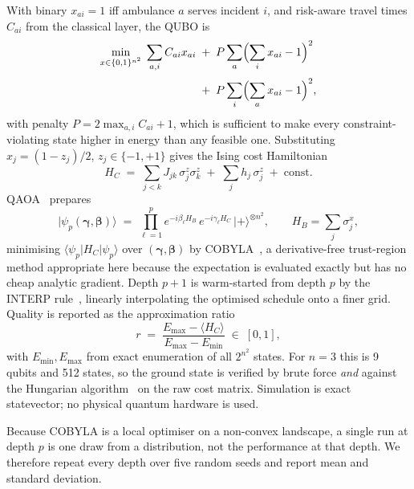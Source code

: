 \documentclass[journal]{IEEEtran}
\begin{document}
With binary $x_{ai}=1$ iff ambulance $a$ serves incident $i$, and risk-aware
travel times $C_{ai}$ from the classical layer, the QUBO is
\begin{equation}
\begin{aligned}
\min_{x\in\{0,1\}^{n^2}}\; \sum_{a,i} C_{ai}x_{ai}
\;&+\; P\sum_{a}\Bigl(\sum_i x_{ai}-1\Bigr)^{2} \\[2pt]
&+\; P\sum_{i}\Bigl(\sum_a x_{ai}-1\Bigr)^{2},
\end{aligned}
\label{eq:qubo}
\end{equation}
with penalty $P=2\max_{a,i}C_{ai}+1$, which is sufficient to make every
constraint-violating state higher in energy than any feasible one. Substituting
$x_j=(1-z_j)/2$, $z_j\in\{-1,+1\}$ gives the Ising cost
Hamiltonian~\citep{lucas2014}
\begin{equation}
H_C \;=\; \sum_{j<k} J_{jk}\,\sigma^z_j\sigma^z_k \;+\; \sum_j h_j\,\sigma^z_j
\;+\; \mathrm{const}.
\label{eq:ising}
\end{equation}
QAOA~\citep{farhi2014} prepares
\begin{equation}
\lvert\psi_p(\boldsymbol\gamma,\boldsymbol\beta)\rangle \;=\;
\prod_{\ell=1}^{p} e^{-i\beta_\ell H_B}\,e^{-i\gamma_\ell H_C}\,
\lvert +\rangle^{\otimes n^2},
\qquad H_B=\sum_j \sigma^x_j,
\label{eq:qaoa}
\end{equation}
minimising $\langle\psi_p\lvert H_C\rvert\psi_p\rangle$ over
$(\boldsymbol\gamma,\boldsymbol\beta)$ by COBYLA~\citep{powell1994}, a
derivative-free trust-region method appropriate here because the expectation is
evaluated exactly but has no cheap analytic gradient. Depth $p+1$ is warm-started
from depth $p$ by the INTERP rule~\citep{zhou2020}, linearly interpolating the
optimised schedule onto a finer grid. Quality is reported as the approximation
ratio
\begin{equation}
r \;=\; \frac{E_{\max}-\langle H_C\rangle}{E_{\max}-E_{\min}} \;\in\; [0,1],
\label{eq:ratio}
\end{equation}
with $E_{\min},E_{\max}$ from exact enumeration of all $2^{n^2}$ states. For
$n=3$ this is 9 qubits and 512 states, so the ground state is verified by brute
force \emph{and} against the Hungarian algorithm~\citep{kuhn1955} on the raw cost
matrix. Simulation is exact statevector; no physical quantum hardware is used.

Because COBYLA is a local optimiser on a non-convex landscape, a single run at
depth $p$ is one draw from a distribution, not the performance at that
depth. We therefore repeat every depth over five random seeds and report mean and
standard deviation.
\end{document}
